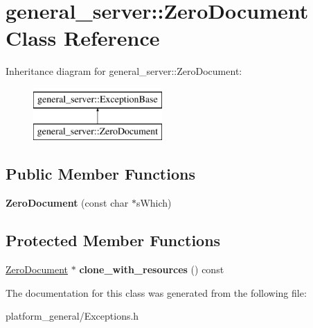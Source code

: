 \hypertarget{classgeneral__server_1_1ZeroDocument}{\section{general\-\_\-server\-:\-:\-Zero\-Document \-Class \-Reference}
\label{classgeneral__server_1_1ZeroDocument}
}
\-Inheritance diagram for general\-\_\-server\-:\-:\-Zero\-Document\-:\begin{figure}[H]
\begin{center}
\leavevmode
\includegraphics[height=2.000000cm]{classgeneral__server_1_1ZeroDocument}
\end{center}
\end{figure}
\subsection*{\-Public \-Member \-Functions}
\begin{DoxyCompactItemize}
\item 
\hypertarget{classgeneral__server_1_1ZeroDocument_a628b29389644093651a3397fd1adf6a4}{{\bfseries \-Zero\-Document} (const char $\ast$s\-Which)}\label{classgeneral__server_1_1ZeroDocument_a628b29389644093651a3397fd1adf6a4}

\end{DoxyCompactItemize}
\subsection*{\-Protected \-Member \-Functions}
\begin{DoxyCompactItemize}
\item 
\hypertarget{classgeneral__server_1_1ZeroDocument_ad4aad59fb0821aad6f3e814f4c723c00}{\hyperlink{classgeneral__server_1_1ZeroDocument}{\-Zero\-Document} $\ast$ {\bfseries clone\-\_\-with\-\_\-resources} () const }\label{classgeneral__server_1_1ZeroDocument_ad4aad59fb0821aad6f3e814f4c723c00}

\end{DoxyCompactItemize}


\-The documentation for this class was generated from the following file\-:\begin{DoxyCompactItemize}
\item 
platform\-\_\-general/\-Exceptions.\-h\end{DoxyCompactItemize}
